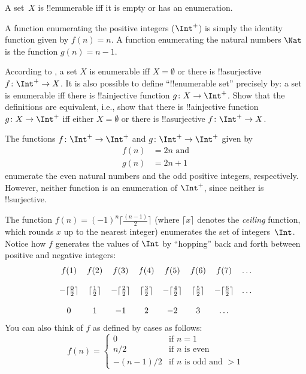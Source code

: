 \documentclass[../../../include/open-logic-section]{subfiles}
\begin{document}
\begin{defn}
  A set~$X$ is !!{enumerable} iff it is empty or has an enumeration.
\end{defn}

\begin{ex}
A function enumerating the positive integers ($\Int^+$) is simply the
identity function given by $f(n) = n$. A function enumerating the
natural numbers $\Nat$ is the function $g(n) = n - 1$.
\end{ex}

\begin{prob}
  According to , a set $X$ is enumerable iff $X
  = \emptyset$ or there is !!a{surjective} $f\colon \Int^+ \to X$.  It
  is also possible to define ``!!{enumerable} set'' precisely by: a
  set is enumerable iff there is !!a{injective} function $g\colon X
  \to \Int^+$.  Show that the definitions are equivalent, i.e., show
  that there is !!a{injective} function $g\colon X \to \Int^+$ iff
  either $X = \emptyset$ or there is !!a{surjective} $f\colon \Int^+
  \to X$.
\end{prob}

\begin{ex}
The functions $f\colon \Int^+ \to \Int^+$ and $g \colon \Int^+ \to
\Int^+$ given by
\begin{align}
f(n) & = 2n \text{ and}\\
g(n) & = 2n+1
\end{align}
enumerate the even natural numbers and the odd positive integers,
respectively. However, neither function is an enumeration of
$\Int^+$, since neither is !!{surjective}.
\end{ex}

\begin{ex}
The function $f(n) = (-1)^{n} \lceil \frac{(n-1)}{2}\rceil$ (where
$\lceil x \rceil$ denotes the \emph{ceiling} function, which rounds
$x$ up to the nearest integer) enumerates the set of
integers~$\Int$. Notice how $f$ generates the values of $\Int$ by
``hopping'' back and forth between positive and negative integers:
\[
\begin{array}{c c c c c c c c}
f(1) & f(2) & f(3) & f(4) & f(5) & f(6) & f(7) & \dots \\ \\
- \lceil \tfrac{0}{2} \rceil & \lceil \tfrac{1}{2}\rceil & - \lceil \tfrac{2}{2} \rceil & \lceil \tfrac{3}{2} \rceil & - \lceil \tfrac{4}{2} \rceil  & \lceil \tfrac{5}{2}
\rceil & - \lceil \tfrac{6}{2} \rceil & \dots \\ \\
0 & 1 & -1 & 2 & -2 & 3 & \dots
\end{array}
\]
You can also think of $f$ as defined by cases as follows:
\[
f(n) = \begin{cases}
  0 & \text{if $n = 1$}\\
  n/2 & \text{if $n$ is even}\\
  -(n-1)/2 & \text{if $n$ is odd and $>1$}
  \end{cases}
\]
\end{ex}
\end{document}
